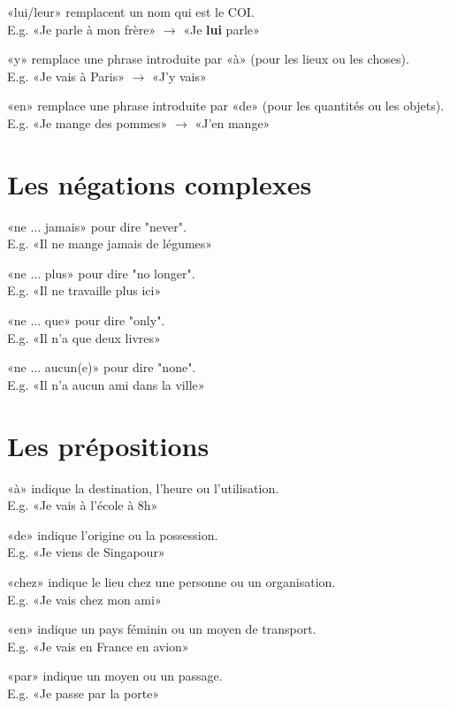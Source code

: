 \documentclass[12pt, a4paper]{article}
\begin{document}
\begin{multicols*}{3}
«lui/leur» remplacent un nom qui est le COI.\\
E.g. «Je parle à mon frère» $\rightarrow$ «Je \textbf{lui} parle»

«y» remplace une phrase introduite par «à» (pour les lieux ou les choses).\\
E.g. «Je vais à Paris» $\rightarrow$ «J'y vais»

«en» remplace une phrase introduite par «de» (pour les quantités ou les objets).\\
E.g. «Je mange des pommes» $\rightarrow$ «J'en  mange»

\section{Les négations complexes}
«ne $\ldots$ jamais» pour dire "never".\\
E.g. «Il ne mange jamais de légumes»

«ne $\ldots$ plus» pour dire "no longer".\\
E.g. «Il ne travaille plus ici»

«ne $\ldots$ que» pour dire "only".\\
E.g. «Il n'a que deux livres»

«ne $\ldots$ aucun(e)» pour dire "none".\\
E.g. «Il n'a aucun ami dans la ville»
\section{Les prépositions}
«à» indique la destination, l'heure ou l'utilisation.\\
E.g. «Je vais à l'école à 8h»

«de» indique l'origine ou la possession.\\
E.g. «Je viens de Singapour»

«chez» indique le lieu chez une personne ou un organisation.\\
E.g. «Je vais chez mon ami»

«en» indique un pays féminin ou un moyen de transport.\\
E.g. «Je vais en France en avion»

«par» indique un moyen ou un passage.\\
E.g. «Je passe par la porte»


\end{multicols*}
\end{document}
